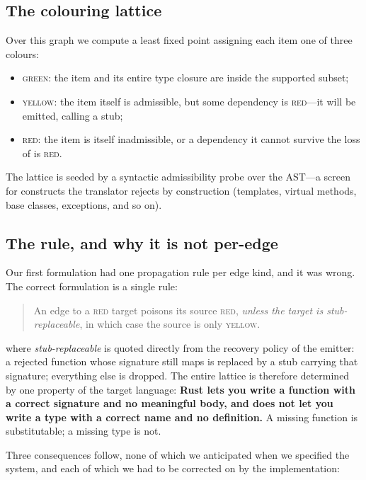 \documentclass[10pt,twocolumn]{article}
\newcommand{\green}[1]{\textcolor{cgreen}{\textsc{#1}}}
\newcommand{\amber}[1]{\textcolor{camber}{\textsc{#1}}}
\newcommand{\red}[1]{\textcolor{cred}{\textsc{#1}}}
\begin{document}


\subsection{The colouring lattice}

Over this graph we compute a least fixed point assigning each item one of
three colours:

\begin{itemize}
\item \green{green}: the item and its entire type closure are inside the
supported subset;
\item \amber{yellow}: the item itself is admissible, but some dependency is
\red{red}---it will be emitted, calling a stub;
\item \red{red}: the item is itself inadmissible, or a dependency it cannot
survive the loss of is \red{red}.
\end{itemize}

The lattice is seeded by a syntactic admissibility probe over the AST---a
screen for constructs the translator rejects by construction (templates,
virtual methods, base classes, exceptions, and so on).

\subsection{The rule, and why it is not per-edge}

Our first formulation had one propagation rule per edge kind, and it was
wrong. The correct formulation is a single rule:

\begin{quote}
An edge to a \red{red} target poisons its source \red{red}, \emph{unless the
target is stub-replaceable}, in which case the source is only \amber{yellow}.
\end{quote}

\noindent where \emph{stub-replaceable} is quoted directly from the recovery
policy of the emitter: a rejected function whose signature still maps is
replaced by a stub carrying that signature; everything else is dropped. The
entire lattice is therefore determined by one property of the target language:
\textbf{Rust lets you write a function with a correct signature and no
meaningful body, and does not let you write a type with a correct name and no
definition.} A missing function is substitutable; a missing type is not.

Three consequences follow, none of which we anticipated when we specified the
system, and each of which we had to be corrected on by the implementation:
\end{document}
